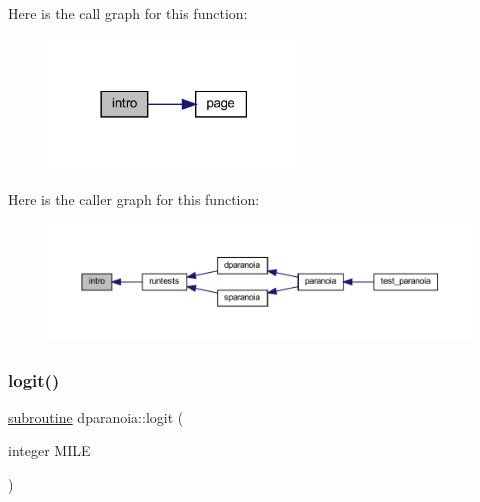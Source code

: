 Here is the call graph for this function\+:
\nopagebreak
\begin{figure}[H]
\begin{center}
\leavevmode
\includegraphics[width=189pt]{dparanoia_8f90_a9116036ac9f8a3d17b60a83da0f1657e_cgraph}
\end{center}
\end{figure}
Here is the caller graph for this function\+:
\nopagebreak
\begin{figure}[H]
\begin{center}
\leavevmode
\includegraphics[width=350pt]{dparanoia_8f90_a9116036ac9f8a3d17b60a83da0f1657e_icgraph}
\end{center}
\end{figure}
\mbox{\label{dparanoia_8f90_a6de1ce1dafc6660e6e63be69dfff7d05}} 
\subsubsection{\texorpdfstring{logit()}{logit()}}
{\footnotesize\ttfamily \hyperlink{M__stopwatch_83_8txt_acfbcff50169d691ff02d4a123ed70482}{subroutine} dparanoia\+::logit (\begin{DoxyParamCaption}\item[{integer}]{M\+I\+LE }\end{DoxyParamCaption})}


